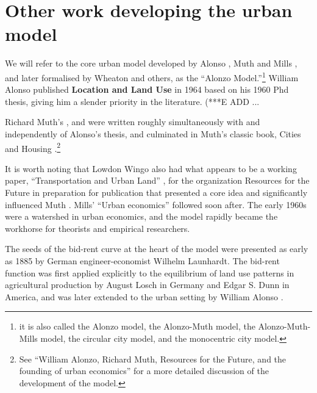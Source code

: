 \section{Other work developing the urban model}



We will refer to the core urban model developed by Alonso \cite{alonsoLocationLandUse1964}, Muth \cite{muthCitiesHousingSpatial1969} and Mills \cite{millsAggregativeModelResource1967}, and later formalised by Wheaton \cite{wheatonComparativeStaticAnalysis1974} and others, as the ``Alonzo Model.''\footnote{it is also called the Alonzo model, the Alonzo-Muth model, the Alonzo-Muth-Mills model, the circular city model, and the monocentric city model.} William Alonso published \textbf{Location and Land Use} in 1964  \cite{alonsoLocationLandUse1964} based on his 1960 Phd thesis,\cite{alonsoModelUrbanLand1960} 
giving him a slender priority in the literature.  (***E ADD ... %

Richard Muth's \cite{muthSpatialStructureHousing1961}, and \cite{muthRationalExpectationsTheory1961}  were written roughly simultaneously with and independently of Alonso's thesis, and  culminated in Muth's classic book, Cities and Housing  \cite{muthCitiesHousingSpatial1969}.\footnote{See ``William Alonzo, Richard Muth, Resources for  the Future, and the founding of urban economics''\cite{mcdonaldWilliamAlonsoRichard2007} for a more detailed discussion of the development of the model.}  %

It is worth noting that Lowdon Wingo also had what appears to be a working paper, ``Transportation and Urban Land'' \cite{wingoTransportationUrbanLand1961}, for the organization Resources for the Future  in preparation for publication that presented a core idea and  significantly influenced Muth \cite{mcdonaldWilliamAlonsoRichard2007}. Mills' ``Urban economics'' \cite{millsUrbanEconomics1972} followed soon after. The early 1960s were a watershed in urban economics, and the model rapidly became the workhorse for theorists and empirical researchers.

 The seeds of the bid-rent curve at the heart of the model were presented as early as 1885  by German engineer-economist Wilhelm Launhardt. \cite{blaugEconomicTheoryRetrospect1985, launhardtMathematischeBegruendungVolkswirthschaftslehre1885} The  \gls{bid-rent function} was first applied explicitly to the equilibrium of land use patterns in agricultural production by August Losch \cite{loschEconomicsLocation1954} in Germany and Edgar S. Dunn \cite{dunnEquilibriumLandUsePatterns1954} in America, and was later extended to the urban setting by William Alonso \cite{alonsoModelUrbanLand1960}. 
 

